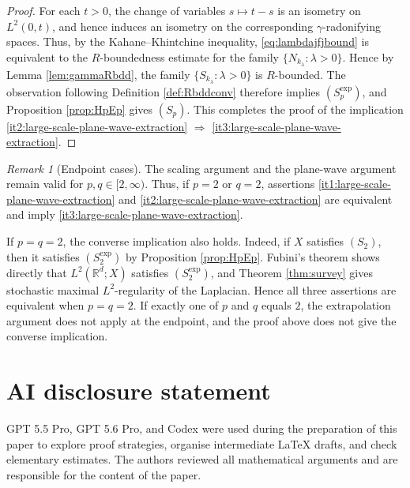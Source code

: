 \documentclass{amsart}
\theoremstyle{plain}
\theoremstyle{remark}
\newtheorem{remark}[theorem]{Remark}
\theoremstyle{plain}
\numberwithin{equation}{section}
\newcommand{\R}{\mathbb R}
\newcommand{\1}{\mathbf 1}
\begin{document}
\begin{proof}
For each $t>0$, the change of variables $s\mapsto t-s$ is an isometry on $L^2(0,t)$, and hence induces an isometry on the corresponding $\gamma$-radonifying spaces. Thus, by the Kahane–Khintchine inequality, \eqref{eq:lambdajfjbound}  is equivalent to the $R$-boundedness estimate for the family \(\{N_{k_\lambda}:\lambda>0\}\). Hence by Lemma \ref{lem:gammaRbdd}, the family \(\{S_{k_\lambda}:\lambda>0\}\) is $R$-bounded. The observation following Definition \ref{def:Rbddconv} therefore implies $(S_p^{\exp})$, and Proposition \ref{prop:HpEp} gives $(S_p)$. This completes the proof of the implication
\ref{it2:large-scale-plane-wave-extraction} $\Rightarrow$ \ref{it3:large-scale-plane-wave-extraction}.
\end{proof}

\begin{remark}[Endpoint cases]
\label{rem:large-scale-plane-wave-endpoints}
The scaling argument and the plane-wave argument remain valid for $p,q\in[2,\infty)$. Thus, if $p=2$ or $q=2$, assertions
\ref{it1:large-scale-plane-wave-extraction} and \ref{it2:large-scale-plane-wave-extraction} are equivalent and imply \ref{it3:large-scale-plane-wave-extraction}.

If $p=q=2$, the converse implication also holds. Indeed, if $X$ satisfies $(S_2)$, then it satisfies $(S_2^{\exp})$ by Proposition \ref{prop:HpEp}. Fubini's theorem shows directly that $L^2(\R^d;X)$ satisfies $(S_2^{\exp})$, and Theorem \ref{thm:survey} gives stochastic maximal $L^2$-regularity of the Laplacian. Hence all three assertions are equivalent when $p=q=2$. If exactly one of $p$ and $q$ equals $2$, the extrapolation argument does not apply at the endpoint, and the proof above does not give the converse implication.
\end{remark}

\section*{AI disclosure statement}

GPT 5.5 Pro, GPT 5.6 Pro, and Codex were used during the preparation of this paper to explore proof strategies, organise intermediate LaTeX drafts, and check elementary estimates. The authors reviewed all mathematical arguments and are responsible for the content of the paper.




\end{document}
